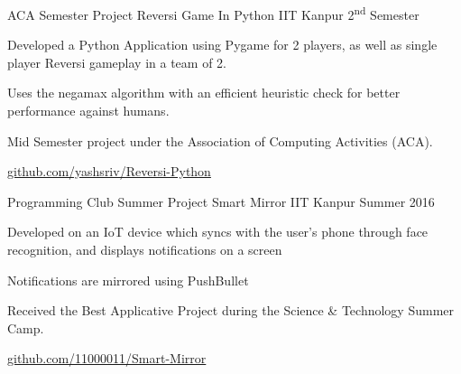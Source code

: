 

\begin{cventries}

  \cventry
  {ACA Semester Project} %
  {Reversi Game In Python} %
  {IIT Kanpur} %
  {2\textsuperscript{nd} Semester} %
  {
    \begin{cvitems} %
    \item {Developed a Python Application using Pygame for 2 players, as well
        as single player Reversi gameplay in a team of 2.}
    \item {Uses the negamax algorithm with an efficient heuristic check
        for better performance against humans.}
    \item{Mid Semester project under the Association of Computing
        Activities (ACA).}
    \item \href{https://github.com/yashsriv/Reversi-Python}{github.com/yashsriv/Reversi-Python}
    \end{cvitems}
  }

  \cventry
  {Programming Club Summer Project} %
  {Smart Mirror} %
  {IIT Kanpur} %
  {Summer 2016} %
  {
    \begin{cvitems} %
    \item {Developed on an IoT device which syncs with the user's phone through face
        recognition, and displays notifications on a screen }
    \item {Notifications are mirrored using PushBullet}
    \item {Received the Best Applicative Project during the Science \&
        Technology Summer Camp.}
    \item \href{https://github.com/11000011/Smart-Mirror}{github.com/11000011/Smart-Mirror}
    \end{cvitems}
  }

\end{cventries}
